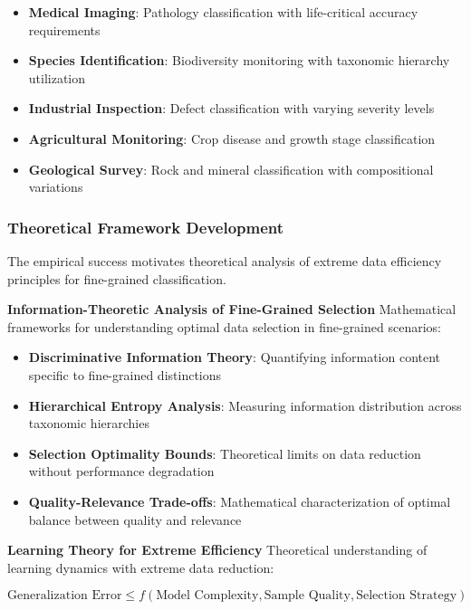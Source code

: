 \documentclass[12pt]{article}
\begin{document}
\begin{itemize}
\item \textbf{Medical Imaging}: Pathology classification with life-critical accuracy requirements
\item \textbf{Species Identification}: Biodiversity monitoring with taxonomic hierarchy utilization
\item \textbf{Industrial Inspection}: Defect classification with varying severity levels
\item \textbf{Agricultural Monitoring}: Crop disease and growth stage classification
\item \textbf{Geological Survey}: Rock and mineral classification with compositional variations
\end{itemize}

\subsubsection{Theoretical Framework Development}\label{theoretical-future}

The empirical success motivates theoretical analysis of extreme data efficiency principles for fine-grained classification.

\textbf{Information-Theoretic Analysis of Fine-Grained Selection}
Mathematical frameworks for understanding optimal data selection in fine-grained scenarios:

\begin{itemize}
\item \textbf{Discriminative Information Theory}: Quantifying information content specific to fine-grained distinctions
\item \textbf{Hierarchical Entropy Analysis}: Measuring information distribution across taxonomic hierarchies
\item \textbf{Selection Optimality Bounds}: Theoretical limits on data reduction without performance degradation
\item \textbf{Quality-Relevance Trade-offs}: Mathematical characterization of optimal balance between quality and relevance
\end{itemize}

\textbf{Learning Theory for Extreme Efficiency}
Theoretical understanding of learning dynamics with extreme data reduction:

\begin{equation}
\text{Generalization Error} \leq f(\text{Model Complexity}, \text{Sample Quality}, \text{Selection Strategy})
\end{equation}
\end{document}
